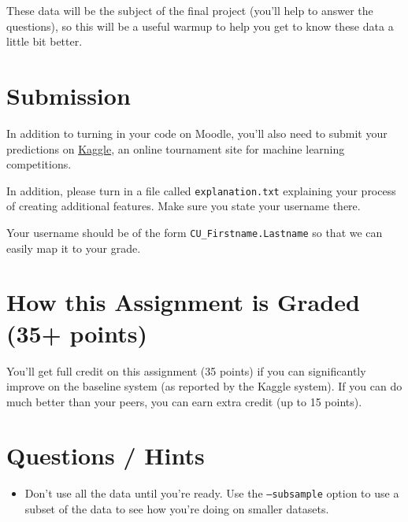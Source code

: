 \documentclass[11pt]{article}
\begin{document}
These data will be the subject of the final project (you'll help to answer the questions), so this will be a useful warmup to help you get to know these data a little bit better.

\section*{Submission}

In addition to turning in your code on Moodle, you'll also need to
submit your predictions
on \href{https://inclass.kaggle.com/c/cmsc-5832-classification}{Kaggle},
an online tournament site for machine learning competitions.

In addition, please turn in a file called \texttt{explanation.txt}
explaining your process of creating additional features.  Make sure
you state your username there.

Your username should be of the form \texttt{CU\_Firstname.Lastname} so
that we can easily map it to your grade.

\section*{How this Assignment is Graded (35+ points)}

You'll get full credit on this assignment (35 points) if you can significantly improve on the baseline system (as reported by the Kaggle system).  If you can do much better than your peers, you can earn extra credit (up to 15 points).

\section*{Questions / Hints}

\begin{itemize}
	\item Don't use all the data until you're ready.  Use the \texttt{--subsample} option to use a subset of the data to see how you're doing on smaller datasets.
\end{itemize}
\end{document}
